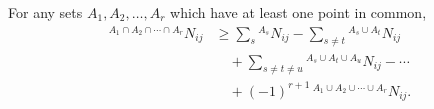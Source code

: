 For any sets $A_1, A_2, \ldots, A_r$ which have at least one point in common,
\begin{align*}
{}^{A_1 \cap A_2 \cap \cdots \cap A_r} N_{ij}
&\geq \sum_s {}^{A_s} N_{ij} - \sum_{s \neq t} {}^{A_s \cup A_t} N_{ij} \\
&\quad + \sum_{s \neq t \neq u} {}^{A_s \cup A_t \cup A_u} N_{ij} - \cdots \\
&\quad + (-1)^{r+1} \, {}^{A_1 \cup A_2 \cup \cdots \cup A_r} N_{ij}.
\end{align*}
